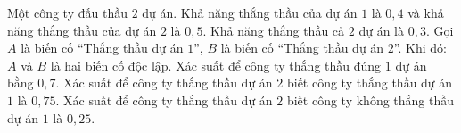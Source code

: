 \begin{ex}
Một công ty đấu thầu $2$ dự án. Khả năng thắng thầu của dự án $1$ là $0{,}4$ và khả năng thắng thầu của dự án $2$ là $0{,}5$. Khả năng thắng thầu cả $2$ dự án là $0{,}3$. Gọi $A$ là biến cố ``Thắng thầu dự án $1$'', $B$ là biến cố ``Thắng thầu dự án $2$''. Khi đó:
\choiceTF
{$A$ và $B$ là hai biến cố độc lập.}
{Xác suất để công ty thắng thầu đúng $1$ dự án bằng $0{,}7$.}
{\True Xác suất để công ty thắng thầu dự án $2$ biết công ty thắng thầu dự án $1$ là $0{,}75$.}
{Xác suất để công ty thắng thầu dự án $2$ biết công ty không thắng thầu dự án $1$ là $0{,}25$.}
\end{ex}
